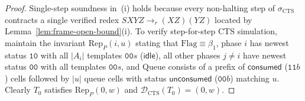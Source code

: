 \documentclass[11pt,reqno]{amsart}
\numberwithin{equation}{section}
\theoremstyle{plain}
\theoremstyle{definition}
\theoremstyle{remark}
\begin{document}
\begin{proof}
Single-step soundness in~(i) holds because every non-halting step of $\sigma_{\mathrm{CTS}}$ contracts a single verified redex $S X Y Z \to_r (X Z)(Y Z)$ located by Lemma~\ref{lem:frame-open-bound}(i). To verify step-for-step CTS simulation, maintain the invariant $\mathrm{Rep}_P(i, u)$ stating that $\mathrm{Flag} \equiv \beta_1$, phase $i$ has newest status $\mathtt{10}$ with all $|A_i|$ templates $\mathtt{00}s$ ($\mathsf{idle}$), all other phases $j \ne i$ have newest status $\mathtt{00}$ with all templates $\mathtt{00}s$, and $\mathrm{Queue}$ consists of a prefix of $\mathsf{consumed}$ ($\mathtt{11}b$) cells followed by $|u|$ queue cells with status $\mathsf{unconsumed}$ ($\mathtt{00}b$) matching $u$. Clearly $T_0$ satisfies $\mathrm{Rep}_P(0, w)$ and $\mathcal{D}_{\mathrm{CTS}}(T_0) = (0, w)$.


\end{proof}
\end{document}
